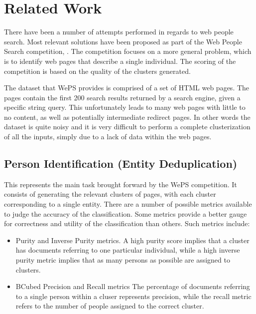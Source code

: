 \chapter{Related Work}
\label{chapter:project-desc}

There have been a number of attempts performed in regards to web people search.
Most relevant solutions have been proposed as part of the Web People Search competition,
\cite{weps3-eval}\cite{weps2-eval}. The competition focuses on a more general
problem, which is to identify web pages that describe a single individual. The
scoring of the competition is based on the quality of the clusters generated.

The dataset that WePS provides is comprised of a set of HTML web pages.
The pages contain the first 200 \cite{weps3-eval} search results returned by a search engine, given
a specific string query. This unfortunately leads to many web pages with
little to no content, as well as potentially intermediate redirect pages.
In other words the dataset is quite noisy and it is very difficult to perform
a complete clusterization of all the inputs, simply due to a lack of data within
the web pages.

\section{Person Identification (Entity Deduplication)}
\label{sec:person-id}
This represents the main task brought forward by the WePS \cite{weps2-eval} competition.
It consists of generating the relevant clusters of pages, with each cluster corresponding
to a single entity. There are a number of possible metrics available to judge the accuracy
of the classification. Some metrics provide a better gauge for correctness and utility of
the classification than others. Such metrics include:

\begin{itemize}
    \item
      Purity and Inverse Purity metrics. 
      A high purity score implies that a cluster has documents referring to one
      particular individual, while a high inverse purity metric implies that as
      many persons as possible are assigned to clusters.
    \item
      BCubed Precision and Recall metrics
      The percentage of documents referring to a single person within a cluser
      represents precision, while the recall metric refers to the number of people assigned
      to the correct cluster.
\end{itemize}

